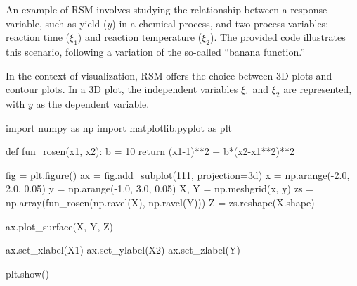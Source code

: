 \documentclass[
  letterpaper,
  DIV=11,
  numbers=noendperiod]{scrreprt}
\newenvironment{Shaded}{\begin{snugshade}}{\end{snugshade}}
\newcommand{\ControlFlowTok}[1]{\textcolor[rgb]{0.00,0.23,0.31}{#1}}
\newcommand{\DecValTok}[1]{\textcolor[rgb]{0.68,0.00,0.00}{#1}}
\newcommand{\FloatTok}[1]{\textcolor[rgb]{0.68,0.00,0.00}{#1}}
\newcommand{\ImportTok}[1]{\textcolor[rgb]{0.00,0.46,0.62}{#1}}
\newcommand{\KeywordTok}[1]{\textcolor[rgb]{0.00,0.23,0.31}{#1}}
\newcommand{\NormalTok}[1]{\textcolor[rgb]{0.00,0.23,0.31}{#1}}
\newcommand{\OperatorTok}[1]{\textcolor[rgb]{0.37,0.37,0.37}{#1}}
\newcommand{\StringTok}[1]{\textcolor[rgb]{0.13,0.47,0.30}{#1}}
\begin{document}
An example of RSM involves studying the relationship between a response
variable, such as yield (\(y\)) in a chemical process, and two process
variables: reaction time (\(\xi_1\)) and reaction temperature
(\(\xi_2\)). The provided code illustrates this scenario, following a
variation of the so-called ``banana function.''

In the context of visualization, RSM offers the choice between 3D plots
and contour plots. In a 3D plot, the independent variables \(\xi_1\) and
\(\xi_2\) are represented, with \(y\) as the dependent variable.

\begin{Shaded}
\begin{Highlighting}[]
\ImportTok{import}\NormalTok{ numpy }\ImportTok{as}\NormalTok{ np}
\ImportTok{import}\NormalTok{ matplotlib.pyplot }\ImportTok{as}\NormalTok{ plt}

\KeywordTok{def}\NormalTok{ fun\_rosen(x1, x2):}
\NormalTok{    b }\OperatorTok{=} \DecValTok{10}
    \ControlFlowTok{return}\NormalTok{ (x1}\OperatorTok{{-}}\DecValTok{1}\NormalTok{)}\OperatorTok{**}\DecValTok{2} \OperatorTok{+}\NormalTok{ b}\OperatorTok{*}\NormalTok{(x2}\OperatorTok{{-}}\NormalTok{x1}\OperatorTok{**}\DecValTok{2}\NormalTok{)}\OperatorTok{**}\DecValTok{2}

\NormalTok{fig }\OperatorTok{=}\NormalTok{ plt.figure()}
\NormalTok{ax }\OperatorTok{=}\NormalTok{ fig.add\_subplot(}\DecValTok{111}\NormalTok{, projection}\OperatorTok{=}\StringTok{\textquotesingle{}3d\textquotesingle{}}\NormalTok{)}
\NormalTok{x }\OperatorTok{=}\NormalTok{ np.arange(}\OperatorTok{{-}}\FloatTok{2.0}\NormalTok{, }\FloatTok{2.0}\NormalTok{, }\FloatTok{0.05}\NormalTok{)}
\NormalTok{y }\OperatorTok{=}\NormalTok{ np.arange(}\OperatorTok{{-}}\FloatTok{1.0}\NormalTok{, }\FloatTok{3.0}\NormalTok{, }\FloatTok{0.05}\NormalTok{)}
\NormalTok{X, Y }\OperatorTok{=}\NormalTok{ np.meshgrid(x, y)}
\NormalTok{zs }\OperatorTok{=}\NormalTok{ np.array(fun\_rosen(np.ravel(X), np.ravel(Y)))}
\NormalTok{Z }\OperatorTok{=}\NormalTok{ zs.reshape(X.shape)}

\NormalTok{ax.plot\_surface(X, Y, Z)}

\NormalTok{ax.set\_xlabel(}\StringTok{\textquotesingle{}X1\textquotesingle{}}\NormalTok{)}
\NormalTok{ax.set\_ylabel(}\StringTok{\textquotesingle{}X2\textquotesingle{}}\NormalTok{)}
\NormalTok{ax.set\_zlabel(}\StringTok{\textquotesingle{}Y\textquotesingle{}}\NormalTok{)}

\NormalTok{plt.show()}
\end{Highlighting}
\end{Shaded}
\end{document}
